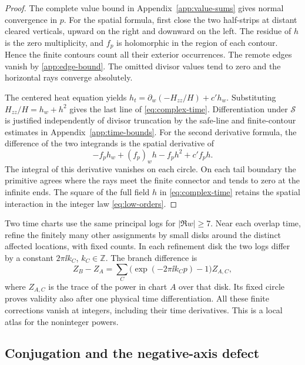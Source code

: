 \begin{proof}
The complete value bound in Appendix~\ref{app:value-sums} gives normal
convergence in \(p\). For the spatial formula, first close the two
half-strips at distant cleared verticals, upward on the right and
downward on the left. The residue of \(h\) is the zero multiplicity,
and \(f_p\) is holomorphic in the region of each contour. Hence the
finite contours count all their exterior occurrences. The remote
edges vanish by \eqref{app:edge-bound}. The omitted divisor values
tend to zero and the horizontal rays converge absolutely.

The centered heat equation yields
\(h_t=\partial_w(-H_{zz}/H)+c'h_w\). Substituting
\(H_{zz}/H=h_w+h^2\) gives the last line of
\eqref{eq:complex-time}. Differentiation under \(\mathcal S\) is
justified independently of divisor truncation by the safe-line and
finite-contour estimates in Appendix~\ref{app:time-bounds}. For the
second derivative formula, the difference of the two integrands is
the spatial derivative of
\[
 -f_ph_w+(f_p)_wh-f_ph^2+c'f_ph .
\]
The integral of this derivative vanishes on each circle. On each
tail boundary the primitive agrees where the rays meet the finite
connector and tends to zero at the infinite ends. The square of
the full field \(h\) in \eqref{eq:complex-time} retains the
spatial interaction in the integer law \eqref{eq:low-orders}.
\end{proof}

Two time charts use the same principal logs for \(|\Re w|\ge7\).
Near each overlap time, refine the finitely many other assignments
by small disks around the distinct affected locations, with fixed
counts. In each refinement disk the two logs differ by a constant
\(2\pi\ii k_C\), \(k_C\in\mathbb{Z}\). The branch difference is
\begin{equation}
 Z_B-Z_A=\sum_C\big(\exp(-2\pi\ii k_Cp)-1\big)Z_{A,C},
 \label{cp:transition}
\end{equation}
where \(Z_{A,C}\) is the trace of the power in chart \(A\) over
that disk. Its fixed circle proves validity also after one
physical time differentiation. All these finite corrections
vanish at integers, including their time derivatives. This is a
local atlas for the noninteger powers.

\subsection{Conjugation and the negative-axis defect}

